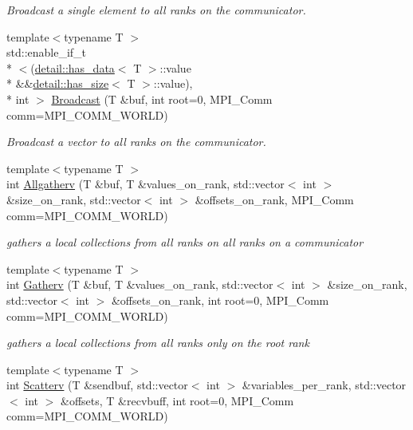 \begin{DoxyCompactItemize}
\begin{DoxyCompactList}\small\item\em Broadcast a single element to all ranks on the communicator. \end{DoxyCompactList}\item 
{\footnotesize template$<$typename T $>$ }\\std\-::enable\-\_\-if\-\_\-t\\*
$<$(\hyperlink{structop_1_1mpi_1_1detail_1_1has__data}{detail\-::has\-\_\-data}$<$ T $>$\-::value \\*
\&\&\hyperlink{structop_1_1mpi_1_1detail_1_1has__size}{detail\-::has\-\_\-size}$<$ T $>$\-::value), \\*
int $>$ \hyperlink{namespaceop_1_1mpi_aee87c783301e36c15d3518ceb5b38437}{Broadcast} (T \&buf, int root=0, M\-P\-I\-\_\-\-Comm comm=M\-P\-I\-\_\-\-C\-O\-M\-M\-\_\-\-W\-O\-R\-L\-D)
\begin{DoxyCompactList}\small\item\em Broadcast a vector to all ranks on the communicator. \end{DoxyCompactList}\item 
{\footnotesize template$<$typename T $>$ }\\int \hyperlink{namespaceop_1_1mpi_aed1aea3879f299a7b4d9274cfe4c7ba9}{Allgatherv} (T \&buf, T \&values\-\_\-on\-\_\-rank, std\-::vector$<$ int $>$ \&size\-\_\-on\-\_\-rank, std\-::vector$<$ int $>$ \&offsets\-\_\-on\-\_\-rank, M\-P\-I\-\_\-\-Comm comm=M\-P\-I\-\_\-\-C\-O\-M\-M\-\_\-\-W\-O\-R\-L\-D)
\begin{DoxyCompactList}\small\item\em gathers a local collections from all ranks on all ranks on a communicator \end{DoxyCompactList}\item 
{\footnotesize template$<$typename T $>$ }\\int \hyperlink{namespaceop_1_1mpi_a556f0f13adfa3097553fd91ca121eadc}{Gatherv} (T \&buf, T \&values\-\_\-on\-\_\-rank, std\-::vector$<$ int $>$ \&size\-\_\-on\-\_\-rank, std\-::vector$<$ int $>$ \&offsets\-\_\-on\-\_\-rank, int root=0, M\-P\-I\-\_\-\-Comm comm=M\-P\-I\-\_\-\-C\-O\-M\-M\-\_\-\-W\-O\-R\-L\-D)
\begin{DoxyCompactList}\small\item\em gathers a local collections from all ranks only on the root rank \end{DoxyCompactList}\item 
{\footnotesize template$<$typename T $>$ }\\int \hyperlink{namespaceop_1_1mpi_ad6c2a83e8afabfb630164249f7953d5b}{Scatterv} (T \&sendbuf, std\-::vector$<$ int $>$ \&variables\-\_\-per\-\_\-rank, std\-::vector$<$ int $>$ \&offsets, T \&recvbuff, int root=0, M\-P\-I\-\_\-\-Comm comm=M\-P\-I\-\_\-\-C\-O\-M\-M\-\_\-\-W\-O\-R\-L\-D)

\end{DoxyCompactItemize}

